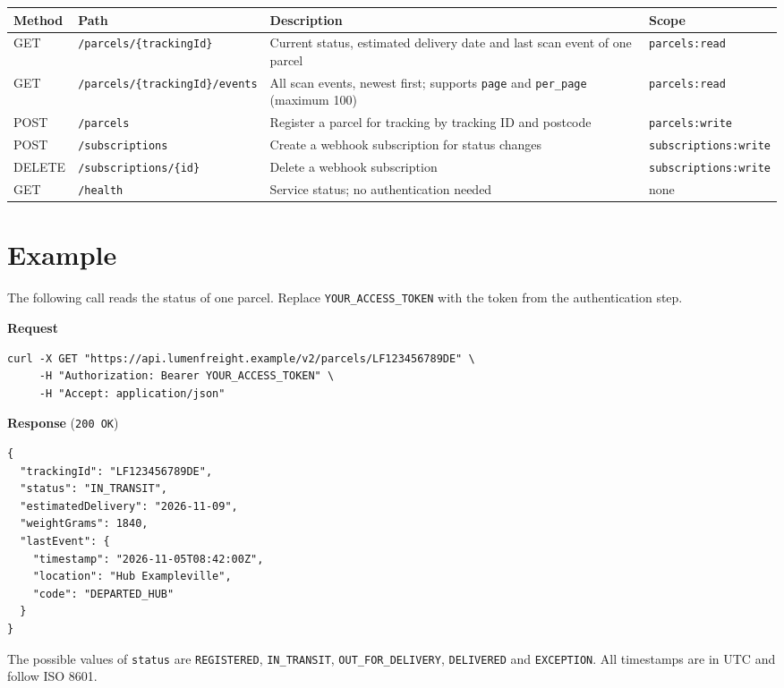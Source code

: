 \documentclass[10pt,a4paper]{article}
\newcommand{\code}[1]{\texttt{#1}}
\begin{document}
\begin{center}
\small
{}
\begin{tabularx}{\linewidth}{@{}l >{\raggedright\arraybackslash}p{5.2cm} >{\raggedright\arraybackslash}X >{\raggedright\arraybackslash}p{2.5cm}@{}}
  \toprule
  \textbf{Method} & \textbf{Path} & \textbf{Description} & \textbf{Scope} \\
  \midrule
  GET & \code{/parcels/\{trackingId\}} & Current status, estimated delivery date and last scan event of one parcel & \code{parcels:read} \\
  GET & \code{/parcels/\{trackingId\}/events} & All scan events, newest first; supports \code{page} and \code{per\_page} (maximum 100) & \code{parcels:read} \\
  POST & \code{/parcels} & Register a parcel for tracking by tracking ID and postcode & \code{parcels:write} \\
  POST & \code{/subscriptions} & Create a webhook subscription for status changes & \code{subscriptions:write} \\
  DELETE & \code{/subscriptions/\{id\}} & Delete a webhook subscription & \code{subscriptions:write} \\
  GET & \code{/health} & Service status; no authentication needed & none \\
  \bottomrule
\end{tabularx}
\end{center}

\section{Example}
The following call reads the status of one parcel. Replace \code{YOUR\_ACCESS\_TOKEN} with the token from the
authentication step.

\textbf{Request}
\begin{lstlisting}
curl -X GET "https://api.lumenfreight.example/v2/parcels/LF123456789DE" \
     -H "Authorization: Bearer YOUR_ACCESS_TOKEN" \
     -H "Accept: application/json"
\end{lstlisting}

\textbf{Response} (\code{200 OK})
\begin{lstlisting}
{
  "trackingId": "LF123456789DE",
  "status": "IN_TRANSIT",
  "estimatedDelivery": "2026-11-09",
  "weightGrams": 1840,
  "lastEvent": {
    "timestamp": "2026-11-05T08:42:00Z",
    "location": "Hub Exampleville",
    "code": "DEPARTED_HUB"
  }
}
\end{lstlisting}
The possible values of \code{status} are \code{REGISTERED}, \code{IN\_TRANSIT}, \code{OUT\_FOR\_DELIVERY},
\code{DELIVERED} and \code{EXCEPTION}. All timestamps are in UTC and follow ISO 8601.
\end{document}
